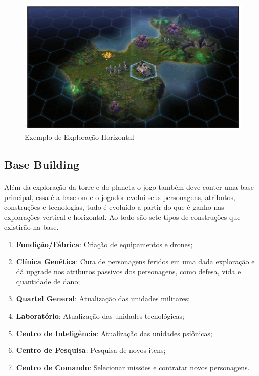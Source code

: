 \documentclass[11pt]{article} %
\begin{document}
\begin{figure}[!htp]
\centering
\includegraphics[scale=0.3]{res/resources.png}
\caption{Exemplo de Exploração Horizontal}
\label{Exemplo de Exploração Horizontal}
\end{figure}

\subsection{Base Building}
\paragraph{}Além da exploração da torre e do planeta o jogo também deve conter uma base principal, essa é a base onde o jogador evolui seus personagens, atributos, construções e tecnologias, tudo é evoluído a partir do que é ganho nas explorações vertical e horizontal. Ao todo são sete tipos de construções que existirão na base.

\begin{enumerate}
  \item \textbf{Fundição/Fábrica}: Criação de equipamentos e drones;
  \item \textbf{Clínica Genética}: Cura de personagens feridos em uma dada exploração e dá upgrade nos atributos passivos dos personagens, como defesa, vida e quantidade de dano;
  \item \textbf{Quartel General}: Atualização das unidades militares;
  \item \textbf{Laboratório}: Atualização das unidades tecnológicas;
  \item \textbf{Centro de Inteligência}: Atualização das unidades psiônicas;
  \item \textbf{Centro de Pesquisa}: Pesquisa de novos itens;
  \item \textbf{Centro de Comando}: Selecionar missões e contratar novos personagens.
\end{enumerate}
\newpage
\end{document}
